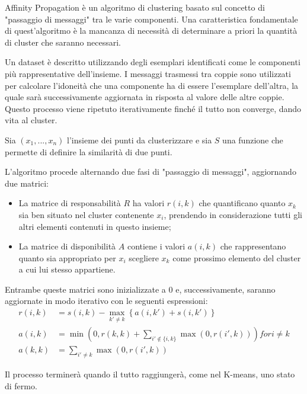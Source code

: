 Affinity Propagation è un algoritmo di clustering basato sul concetto di "passaggio di messaggi" tra le varie componenti. Una caratteristica fondamentale di quest'algoritmo è la mancanza di necessità di determinare a priori la quantità di cluster che saranno necessari.

Un dataset è descritto utilizzando degli esemplari identificati come le componenti più rappresentative dell'insieme. I messaggi trasmessi tra coppie sono utilizzati per calcolare l'idoneità che una componente ha di essere l'esemplare dell'altra, la quale sarà successivamente aggiornata in risposta al valore delle altre coppie. Questo processo viene ripetuto iterativamente finché il tutto non converge, dando vita al cluster.

Sia $(x_1, ..., x_n)$ l'insieme dei punti da clusterizzare e sia $S$ una funzione che permette di definire la similarità di due punti.

L'algoritmo procede alternando due fasi di "passaggio di messaggi", aggiornando due matrici:

\begin{itemize}
	\item La matrice di responsabilità $R$ ha valori $r(i, k)$ che quantificano quanto $x_k$ sia ben situato nel cluster contenente $x_i$, prendendo in considerazione tutti gli altri elementi contenuti in questo insieme;
	\item La matrice di disponibilità $A$ contiene i valori $a(i, k)$ che rappresentano quanto sia appropriato per $x_i$ scegliere $x_k$ come prossimo elemento del cluster a cui lui stesso appartiene.
\end{itemize} 

Entrambe queste matrici sono inizializzate a $0$ e, successivamente, saranno aggiornate in modo iterativo con le seguenti espressioni:
\begin{align*}
	r(i,k) &= s(i,k) - \max_{k' \neq k} \left\{ a(i,k') + s(i,k') \right\}\\
	a(i,k) &= \min \left(0, r(k,k) + \sum_{i' \not\in \{i,k\}} \max(0, r(i',k)) \right) for i \neq k\\
	a(k,k) &= \sum_{i' \neq k} \max(0, r(i',k))
\end{align*}

Il processo terminerà quando il tutto raggiungerà, come nel K-means, uno stato di fermo\cite{affinity}.
